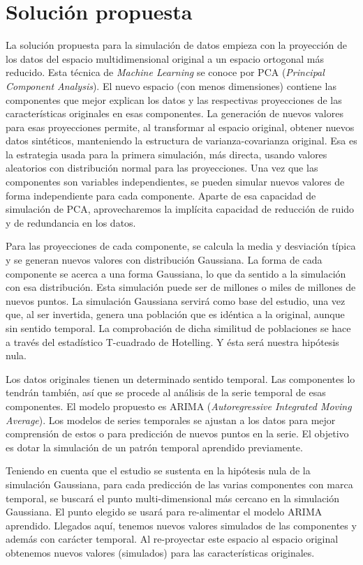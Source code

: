 \documentclass[11pt,spanish,listoffigures,listoftables]{tfgetsinf}
\begin{document}
\chapter{Solución propuesta}
La solución propuesta para la simulación de datos empieza con la proyección de los datos del espacio multidimensional original a un espacio ortogonal más reducido. Esta técnica de {\em Machine Learning} se conoce por PCA ({\em Principal Component Analysis}). El nuevo espacio (con menos dimensiones) contiene las componentes que mejor explican los datos y las respectivas proyecciones de las características originales en esas componentes. La generación de nuevos valores para esas proyecciones permite, al transformar al espacio original, obtener nuevos datos sintéticos, manteniendo la estructura de varianza-covarianza original. Esa es la estrategia usada para la primera simulación, más directa, usando valores aleatorios con distribución normal para las proyecciones. Una vez que las componentes son variables independientes, se pueden simular nuevos valores de forma independiente para cada componente. Aparte de esa capacidad de simulación de PCA, aprovecharemos la implícita capacidad de reducción de ruido y de redundancia en los datos.

Para las proyecciones de cada componente, se calcula la media y desviación típica y se generan nuevos valores con distribución Gaussiana. La forma de cada componente se acerca a una forma Gaussiana, lo que da sentido a la simulación con esa distribución. Esta simulación puede ser de millones o miles de millones de nuevos puntos. La simulación Gaussiana servirá como base del estudio, una vez que, al ser invertida, genera una población que es idéntica a la original, aunque sin sentido temporal. La comprobación de dicha similitud de poblaciones se hace a través del estadístico T-cuadrado de Hotelling. Y ésta será nuestra hipótesis nula.

Los datos originales tienen un determinado sentido temporal. Las componentes lo tendrán también, así que se procede al análisis de la serie temporal de esas componentes. El modelo propuesto es ARIMA ({\em Autoregressive Integrated Moving Average}). Los modelos de series temporales se ajustan a los datos para mejor comprensión de estos o para predicción de nuevos puntos en la serie. El objetivo es dotar la simulación de un patrón temporal aprendido previamente.

Teniendo en cuenta que el estudio se sustenta en la hipótesis nula de la simulación Gaussiana, para cada predicción de las varias componentes con marca temporal, se buscará el punto multi-dimensional más cercano en la simulación Gaussiana. El punto elegido se usará para re-alimentar el modelo ARIMA aprendido. Llegados aquí, tenemos nuevos valores simulados de las componentes y además con carácter temporal. Al re-proyectar este espacio al espacio original obtenemos nuevos valores (simulados) para las características originales.
\end{document}

